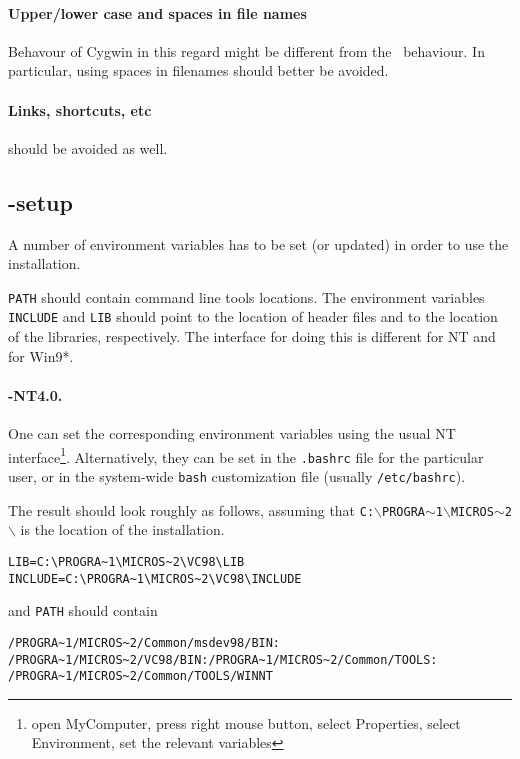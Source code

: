 \paragraph{Upper/lower case and spaces in file names}
Behavour of Cygwin in this regard might be different from the \mswin\ 
behaviour. In particular, using spaces in filenames should better be
avoided.

\paragraph{Links, shortcuts, etc} should be avoided as well.

\subsection{-setup}

A number of environment variables has to be set (or updated)
in order to use the installation.

\texttt{PATH} should contain  command line tools locations.
The environment variables \texttt{INCLUDE} and \texttt{LIB} should
point to the location of  header files and to the location
of the \msvc{6.0} libraries, respectively.
The interface for doing this is different for NT and for Win9*.

\paragraph{\mswin-NT4.0.}

One can set the corresponding environment variables using the
usual NT interface\footnote{open MyComputer, press right mouse button,
  select Properties, select Environment, set the relevant variables}.
Alternatively, they can be set in the \texttt{.bashrc} file for the
particular user, or in the system-wide \texttt{bash} customization
file (usually \texttt{/etc/bashrc}).

The result should look roughly as follows, assuming that
\texttt{C:$\backslash$PROGRA$\sim$1$\backslash$MICROS$\sim$2$\backslash$}
is the location of the \msvc{} installation.
\begin{verbatim}
LIB=C:\PROGRA~1\MICROS~2\VC98\LIB
INCLUDE=C:\PROGRA~1\MICROS~2\VC98\INCLUDE
\end{verbatim}
and \texttt{PATH} should contain
\begin{verbatim}
/PROGRA~1/MICROS~2/Common/msdev98/BIN:
/PROGRA~1/MICROS~2/VC98/BIN:/PROGRA~1/MICROS~2/Common/TOOLS:
/PROGRA~1/MICROS~2/Common/TOOLS/WINNT
\end{verbatim}

